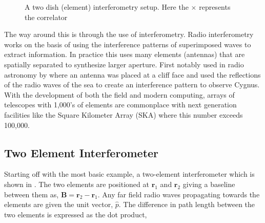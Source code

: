 \begin{figure}
\caption[A two dish (element) interferometry setup.]{A two dish (element) interferometry setup. Here the $\times$ represents the correlator}
\label{fig:chap2interferometryexample}
\end{figure}

The way around this is through the use of interferometry. Radio interferometry works on the basis of using the interference patterns of superimposed waves to extract information. In practice this uses many elements (antennas) that are spatially separated to synthesize larger aperture. First notably used in radio astronomy by \cite{Bolton_Nature_1948} where an antenna was placed at a cliff face and used the reflections of the radio waves of the sea to create an interference pattern to observe Cygnus. With the development of both the field and modern computing, arrays of telescopes with 1,000's of elements are commonplace with next generation facilities like the Square Kilometer Array (SKA) where this number exceeds 100,000. 

\subsection{Two Element Interferometer}

Starting off with the most basic example, a two-element interferometer which is shown in . The two elements are positioned at $\textbf{r}_1$ and $\textbf{r}_2$ giving a baseline between them as, $\textbf{B} = \textbf{r}_2 - \textbf{r}_1$. Any far field radio waves  propagating towards the elements are given the unit vector, $\hat p$. The difference in path length between the two elements is expressed as the dot product, 

